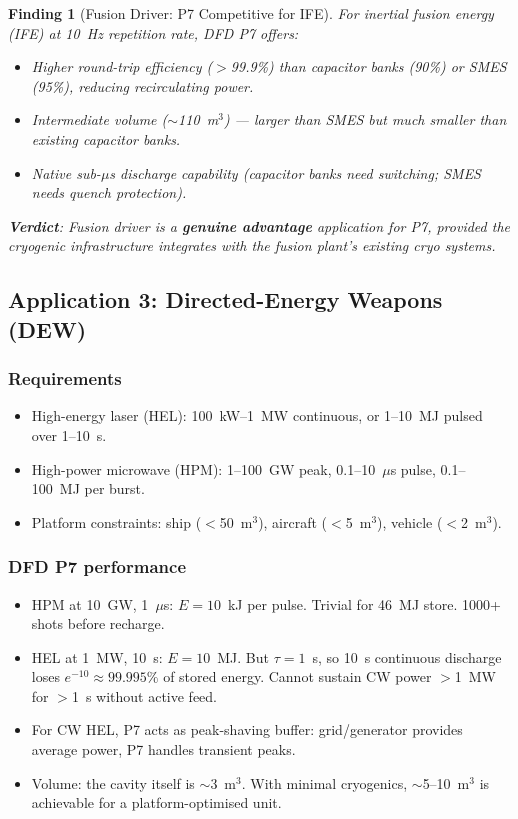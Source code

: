 \documentclass[11pt]{article}
\newtheorem{finding}{Finding}
\begin{document}
\begin{finding}[Fusion Driver: P7 Competitive for IFE]
\label{find:fusion}
For inertial fusion energy (IFE) at 10~Hz repetition rate, DFD P7 offers:
\begin{itemize}[nosep]
  \item Higher round-trip efficiency ($>$99.9\%) than capacitor banks
    (90\%) or SMES (95\%), reducing recirculating power.
  \item Intermediate volume ($\sim$110~m$^3$) --- larger than SMES but
    much smaller than existing capacitor banks.
  \item Native sub-$\mu$s discharge capability (capacitor banks need
    switching; SMES needs quench protection).
\end{itemize}

\textbf{Verdict}: Fusion driver is a \textbf{genuine advantage}
application for P7, provided the cryogenic infrastructure integrates
with the fusion plant's existing cryo systems.
\end{finding}

\subsection{Application 3: Directed-Energy Weapons (DEW)}

\subsubsection{Requirements}
\begin{itemize}[nosep]
  \item High-energy laser (HEL): 100~kW--1~MW continuous, or 1--10~MJ
    pulsed over 1--10~s.
  \item High-power microwave (HPM): 1--100~GW peak, 0.1--10~$\mu$s pulse,
    0.1--100~MJ per burst.
  \item Platform constraints: ship ($<$50~m$^3$), aircraft ($<$5~m$^3$),
    vehicle ($<$2~m$^3$).
\end{itemize}

\subsubsection{DFD P7 performance}
\begin{itemize}[nosep]
  \item HPM at 10~GW, 1~$\mu$s: $E = 10$~kJ per pulse. Trivial for
    46~MJ store. 1000+ shots before recharge.
  \item HEL at 1~MW, 10~s: $E = 10$~MJ. But $\tau = 1$~s, so 10~s
    continuous discharge loses $e^{-10} \approx 99.995\%$ of stored
    energy. Cannot sustain CW power $>$1~MW for $>$1~s without active
    feed.
  \item For CW HEL, P7 acts as peak-shaving buffer: grid/generator
    provides average power, P7 handles transient peaks.
  \item Volume: the cavity itself is $\sim$3~m$^3$. With minimal
    cryogenics, $\sim$5--10~m$^3$ is achievable for a platform-optimised
    unit.
\end{itemize}
\end{document}
